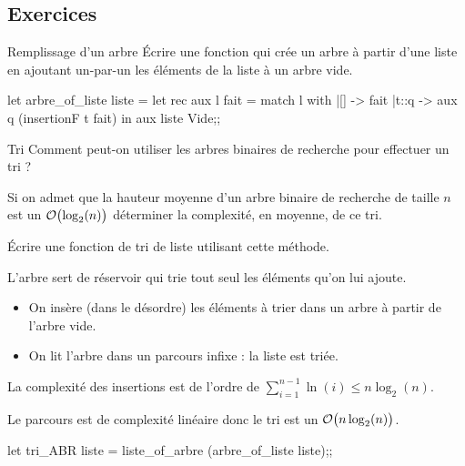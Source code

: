 \subsection{Exercices}
\begin{exo}{Remplissage d'un arbre}{}
Écrire une fonction  qui crée un arbre à partir d'une liste en ajoutant un-par-un les éléments de la liste à un arbre vide.
\reponse
\begin{ocaml}
let arbre_of_liste liste =
  let rec aux l fait =
      match l with
      |[] -> fait
      |t::q -> aux q (insertionF t fait)
  in aux liste Vide;;
\end{ocaml}
\end{exo}
\begin{exo}{Tri}{}
Comment peut-on utiliser les arbres binaires de recherche pour effectuer un tri ?

Si on admet que la hauteur moyenne d'un arbre binaire de recherche de taille $n$ est un ${\cal O}\bigl(\log_2(n)\bigr)$ déterminer la complexité, en moyenne, de ce tri.

Écrire une fonction de tri de liste utilisant cette méthode.
\reponse

L'arbre sert de réservoir qui trie tout seul les éléments qu'on lui ajoute.

\begin{itemize}
\item On insère (dans le désordre) les éléments à trier dans un arbre à partir de l'arbre vide.

\item On lit l'arbre dans un parcours infixe : la liste est triée.

\end{itemize}

La complexité des insertions est de l'ordre de $\displaystyle \sum_{i=1}^{n-1} \ln(i)\le n\log_2(n)$.

Le parcours est de complexité linéaire donc le tri est un ${\cal O}\bigl(n\log_2(n)\bigr)$.

\begin{ocaml}
let tri_ABR liste =
  liste_of_arbre (arbre_of_liste liste);;
\end{ocaml}
\end{exo}
